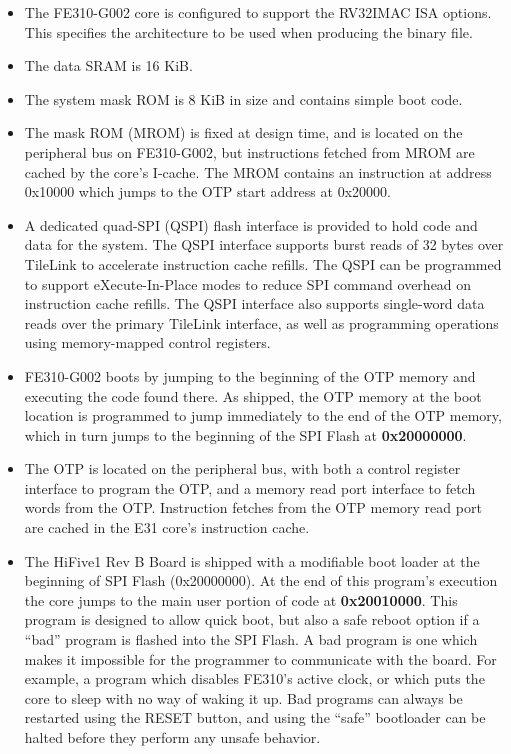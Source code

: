 \documentclass[a4paper,12pt,twoside]{report}
\begin{document}
            \begin{itemize}
            	\item The FE310-G002 core is configured to support the RV32IMAC ISA options. This specifies the architecture to be used when producing the binary file.\cite{hifive1RevBConfig}

				\item The data SRAM is 16 KiB.\cite{hifive1RevBConfig}

            	\item The system mask ROM is 8 KiB in size and contains simple boot code.\cite{hifive1RevBConfig}

                \item The mask ROM (MROM) is fixed at design time, and is located on the peripheral bus on FE310-G002, but instructions fetched from MROM are cached by the core’s I-cache. The MROM contains an instruction at address 0x10000 which jumps to the OTP start address at 0x20000.\cite{fe310g002manBootProcess}

                \item A dedicated quad-SPI (QSPI) flash interface is provided to hold code and data for the system. The QSPI interface supports burst reads of 32 bytes over TileLink to accelerate instruction cache refills. The QSPI can be programmed to support eXecute-In-Place modes to reduce SPI command overhead on instruction cache refills. The QSPI interface also supports single-word data reads over the primary TileLink interface, as well as programming operations using memory-mapped control registers.\cite{hifive1RevBConfig}

            	\item FE310-G002 boots by jumping to the beginning of the OTP memory and executing the code found there. As shipped, the OTP memory at the boot location is programmed to jump immediately to the end of the OTP memory, which in turn jumps to the beginning of the SPI Flash at \textbf{0x20000000}.\cite{hifive1RevBBootCode}

                \item The OTP is located on the peripheral bus, with both a control register interface to program the OTP, and a memory read port interface to fetch words from the OTP. Instruction fetches from the OTP memory read port are cached in the E31 core’s instruction cache.\cite{fe310g002manBootProcess}

                \item The HiFive1 Rev B Board is shipped with a modifiable boot loader at the beginning of SPI Flash (0x20000000). At the end of this program’s execution the core jumps to the main user portion of code at \textbf{0x20010000}. This program is designed to allow quick boot, but also a safe reboot option if a “bad” program is flashed into the SPI Flash. A bad program is one which makes it impossible for the programmer to communicate with the board. For example, a program which disables FE310’s active clock, or which puts the core to sleep with no way of waking it up. Bad programs can always be restarted using the RESET button, and using the “safe” bootloader can be halted before they perform any unsafe behavior.\cite{hifive1RevBBootLoader}


\end{itemize}
\end{document}
